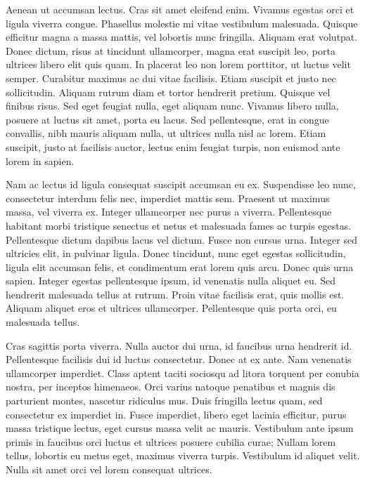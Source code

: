 Aenean ut accumsan lectus. Cras sit amet eleifend enim. Vivamus egestas orci et ligula viverra congue. Phasellus molestie mi vitae vestibulum malesuada. Quisque efficitur magna a massa mattis, vel lobortis nunc fringilla. Aliquam erat volutpat. Donec dictum, risus at tincidunt ullamcorper, magna erat suscipit leo, porta ultrices libero elit quis quam. In placerat leo non lorem porttitor, ut luctus velit semper. Curabitur maximus ac dui vitae facilisis. Etiam suscipit et justo nec sollicitudin. Aliquam rutrum diam et tortor hendrerit pretium. Quisque vel finibus risus. Sed eget feugiat nulla, eget aliquam nunc. Vivamus libero nulla, posuere at luctus sit amet, porta eu lacus. Sed pellentesque, erat in congue convallis, nibh mauris aliquam nulla, ut ultrices nulla nisl ac lorem. Etiam suscipit, justo at facilisis auctor, lectus enim feugiat turpis, non euismod ante lorem in sapien.

Nam ac lectus id ligula consequat suscipit accumsan eu ex. Suspendisse leo nunc, consectetur interdum felis nec, imperdiet mattis sem. Praesent ut maximus massa, vel viverra ex. Integer ullamcorper nec purus a viverra. Pellentesque habitant morbi tristique senectus et netus et malesuada fames ac turpis egestas. Pellentesque dictum dapibus lacus vel dictum. Fusce non cursus urna. Integer sed ultricies elit, in pulvinar ligula. Donec tincidunt, nunc eget egestas sollicitudin, ligula elit accumsan felis, et condimentum erat lorem quis arcu. Donec quis urna sapien. Integer egestas pellentesque ipsum, id venenatis nulla aliquet eu. Sed hendrerit malesuada tellus at rutrum. Proin vitae facilisis erat, quis mollis est. Aliquam aliquet eros et ultrices ullamcorper. Pellentesque quis porta orci, eu malesuada tellus.

Cras sagittis porta viverra. Nulla auctor dui urna, id faucibus urna hendrerit id. Pellentesque facilisis dui id luctus consectetur. Donec at ex ante. Nam venenatis ullamcorper imperdiet. Class aptent taciti sociosqu ad litora torquent per conubia nostra, per inceptos himenaeos. Orci varius natoque penatibus et magnis dis parturient montes, nascetur ridiculus mus. Duis fringilla lectus quam, sed consectetur ex imperdiet in. Fusce imperdiet, libero eget lacinia efficitur, purus massa tristique lectus, eget cursus massa velit ac mauris. Vestibulum ante ipsum primis in faucibus orci luctus et ultrices posuere cubilia curae; Nullam lorem tellus, lobortis eu metus eget, maximus viverra turpis. Vestibulum id aliquet velit. Nulla sit amet orci vel lorem consequat ultrices.

